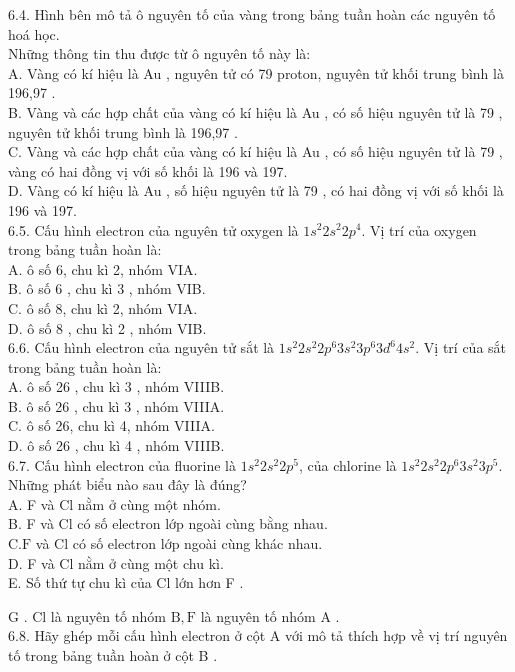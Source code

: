 \documentclass[10pt]{article}
\begin{document}
6.4. Hình bên mô tả ô nguyên tố của vàng trong bảng tuần hoàn các nguyên tố hoá học.\\
Những thông tin thu được từ ô nguyên tố này là:\\
A. Vàng có kí hiệu là Au , nguyên tử có 79 proton, nguyên tử khối trung bình là 196,97 .\\
B. Vàng và các hợp chất của vàng có kí hiệu là Au , có số hiệu nguyên tử là 79 , nguyên tử khối trung bình là 196,97 .\\
C. Vàng và các hợp chất của vàng có kí hiệu là Au , có số hiệu nguyên tử là 79 , vàng có hai đồng vị với số khối là 196 và 197.\\
D. Vàng có kí hiệu là Au , số hiệu nguyên tử là 79 , có hai đồng vị với số khối là 196 và 197.\\
6.5. Cấu hình electron của nguyên tử oxygen là $1 s^{2} 2 s^{2} 2 p^{4}$. Vị trí của oxygen trong bảng tuần hoàn là:\\
A. ô số 6, chu kì 2, nhóm VIA.\\
B. ô số 6 , chu kì 3 , nhóm VIB.\\
C. ô số 8, chu kì 2, nhóm VIA.\\
D. ô số 8 , chu kì 2 , nhóm VIB.\\
6.6. Cấu hình electron của nguyên tử sắt là $1 s^{2} 2 s^{2} 2 p^{6} 3 s^{2} 3 p^{6} 3 d^{6} 4 s^{2}$. Vị trí của sắt trong bảng tuần hoàn là:\\
A. ô số 26 , chu kì 3 , nhóm VIIIB.\\
B. ô số 26 , chu kì 3 , nhóm VIIIA.\\
C. ô số 26, chu kì 4, nhóm VIIIA.\\
D. ô số 26 , chu kì 4 , nhóm VIIIB.\\
6.7. Cấu hình electron của fluorine là $1 s^{2} 2 s^{2} 2 p^{5}$, của chlorine là $1 s^{2} 2 s^{2} 2 p^{6} 3 s^{2} 3 p^{5}$. Những phát biểu nào sau đây là đúng?\\
A. F và Cl nằm ở cùng một nhóm.\\
B. F và Cl có số electron lớp ngoài cùng bằng nhau.\\
$\mathrm{C} . \mathrm{F}$ và Cl có số electron lớp ngoài cùng khác nhau.\\
D. F và Cl nằm ở cùng một chu kì.\\
E. Số thứ tự chu kì của Cl lớn hơn F .

G . Cl là nguyên tố nhóm $\mathrm{B}, \mathrm{F}$ là nguyên tố nhóm A .\\
6.8. Hãy ghép mỗi cấu hình electron ở cột A với mô tả thích hợp về vị trí nguyên tố trong bảng tuần hoàn ở cột B .
\end{document}

